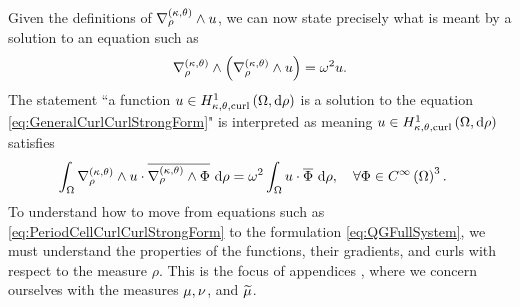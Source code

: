 Given the definitions of $\nabla_{\rho}^{\left( \kappa, \theta \right)}\wedge u$, we can now state precisely what is meant by a solution to an equation such as 
\begin{align} \label{eq:GeneralCurlCurlStrongForm}
	\nabla_{\rho}^{\left( \kappa, \theta \right)}\wedge \left(  \nabla_{\rho}^{\left( \kappa, \theta \right)}\wedge u  \right) = \omega^2 u.
\end{align}
The statement ``a function $u\in H^1_{\kappa,\theta,\mathrm{curl}}\left( \Omega, \mathrm{d}\rho \right)$ is a solution to the equation \eqref{eq:GeneralCurlCurlStrongForm}" is interpreted as meaning $u\in H^1_{\kappa,\theta,\mathrm{curl}}\left( \Omega, \mathrm{d}\rho \right)$ satisfies
\begin{align*}
	\int_{\Omega} \nabla_{\rho}^{\left( \kappa, \theta \right)}\wedge u \cdot \overline{\nabla_{\rho}^{\left( \kappa, \theta \right)}\wedge\Phi}  \ \mathrm{d}\rho &= \omega^2\int_{\Omega} u\cdot\overline{\Phi} \ \mathrm{d}\rho, \quad\forall\Phi\in C^{\infty}\left( \Omega \right)^3.
\end{align*}
To understand how to move from equations such as \eqref{eq:PeriodCellCurlCurlStrongForm} to the formulation \eqref{eq:QGFullSystem}, we must understand the properties of the functions, their gradients, and curls with respect to the measure $\rho$.
This is the focus of appendices , where we concern ourselves with the measures $\mu, \nu$, and $\widetilde{\mu}$.